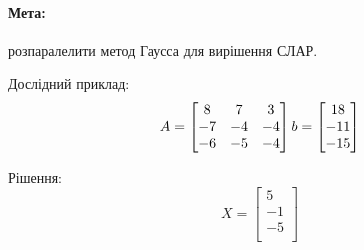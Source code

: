 \documentclass{udstu}
\begin{document}

\tableofcontents

\intro

\paragraph{\textbf{Мета:}} розпаралелити метод Гаусса для вирішення СЛАР.

Дослідний приклад:
\begin{equation*}
	A = \begin{bmatrix}
			8 & 7 & 3 \\
			-7 & -4 & -4 \\
			-6 & -5 & -4 \\
	    \end{bmatrix}
	\\
	b = \begin{bmatrix}
			18 \\
			-11 \\
			-15 \\
	    \end{bmatrix}
\end{equation*}

Рішення:
\begin{equation*}
X = \begin{bmatrix}
		5 \\
		-1 \\
		-5 \\
	\end{bmatrix}
\end{equation*}



\end{document}
